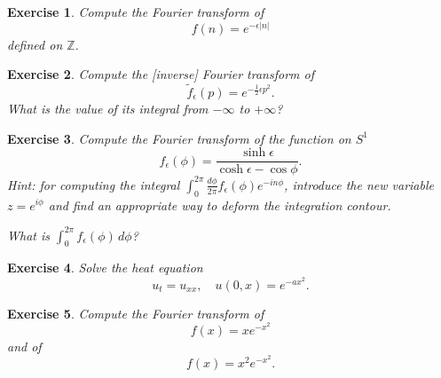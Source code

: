 \documentclass[11pt,a4paper]{article}
\newtheorem*{exercise}{Exercise}
\begin{document}
\begin{exercise}
	Compute the Fourier transform of
	\[
	f(n)=e^{-\epsilon|n|}
	\]
	defined on \(\mathbb{Z}\).
\end{exercise}

\begin{exercise}
	Compute the [inverse] Fourier transform of
	\[
	\tilde{f}_\epsilon(p)=e^{-\frac12\epsilon p^2}.
	\]
	What is the value of its integral from \(-\infty\) to \(+\infty\)?
\end{exercise}

\begin{exercise}
	Compute the Fourier transform of the function on \(S^1\)
	\[
	f_{\epsilon}(\phi) = \frac{\sinh \epsilon}{\cosh \epsilon-\cos \phi}.
	\]
	Hint: for computing the integral \(\int_0^{2\pi} \frac{d\phi}{2\pi} f_{\epsilon}(\phi)e^{-i n \phi}\),
	introduce the new variable \(z=e^{i \phi}\) and find an appropriate way to deform the integration contour.
	
	What is \(\int_0^{2\pi} f_{\epsilon}(\phi)\,d\phi\)?
\end{exercise}

\begin{exercise}
	Solve the heat equation
	\[
	u_t=u_{xx}, \quad u(0,x)=e^{-a x^2}.
	\]
\end{exercise}

\begin{exercise}
	Compute the Fourier transform of
	\[
	f(x)=x e^{-x^2}
	\]
	and of
	\[
	f(x)=x^2 e^{-x^2}.
	\]
\end{exercise}
\end{document}
